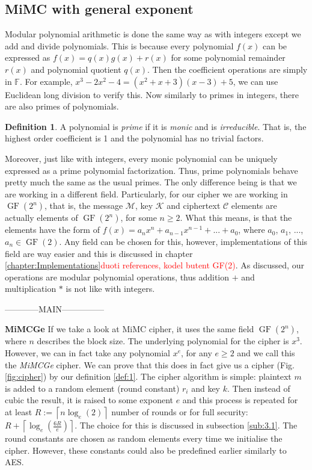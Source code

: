 \documentclass{Resources/UoBLab1}
\theoremstyle{definition}
\newtheorem{definition}[theorem]{Definition}
\begin{document}
\subsection{MiMC with general exponent}
Modular polynomial arithmetic is done the same way as with integers except we add and divide polynomials. This is because every polynomial $f(x)$ can be expressed as $f(x) = q(x)g(x) + r(x)$ for some polynomial remainder $r(x)$ and polynomial quotient $q(x)$. Then the coefficient operations are simply in $\mathbb{F}$. For example, \(x^3-2x^2-4 = (x^2+x+3)(x-3) + 5\), we can use Euclidean long division to verify this. Now similarly to primes in integers, there are also primes of polynomials.
\begin{definition}
    A polynomial is \textit{prime} if it is \textit{monic} and is \textit{irreducible}. That is, the highest order coefficient is 1 and the polynomial has no trivial factors.
\end{definition}
Moreover, just like with integers, every monic polynomial can be uniquely expressed as a prime polynomial factorization. Thus, prime polynomials behave pretty much the same as the usual primes. The only difference being is that we are working in a different field. Particularly, for our cipher we are working in $\operatorname{GF}(2^n)$, that is, the message $\mathcal{M}$, key $\mathcal{K}$ and ciphertext $\mathcal{C}$ elements are actually elements of $\operatorname{GF}(2^n)$, for some $n \ge 2$. What this means, is that the elements have the form of $f(x) = a_nx^n + a_{n-1}x^{n-1} + ... + a_0$, where $a_0$, $a_1$, ..., $a_n \in \operatorname{GF}(2)$. Any field can be chosen for this, however, implementations of this field are way easier and this is discussed in chapter \ref{chapter:Implementations}\textcolor{red}{duoti references, kodel butent GF(2)}. As discussed, our operations are modular polynomial operations, thus addition $+$ and multiplication $*$ is not like with integers.\medskip

------------MAIN---------------

\noindent\textbf{MiMCGe} If we take a look at MiMC cipher\cite{MiMC}, it uses the same field $\operatorname{GF}(2^n)$, where $n$ describes the block size. The underlying polynomial for the cipher is $x^3$. However, we can in fact take any polynomial $x^e$, for any $e \ge 2$ and we call this the \textit{MiMCGe} cipher. We can prove that this does in fact give us a cipher (Fig. \ref{fig:cipher}) by our definition \ref{def:1}. The cipher algorithm is simple: plaintext $m$ is added to a random element (round constant) $r_i$ and key $k$. Then instead of cubic the result, it is raised to some exponent $e$ and this process is repeated for at least $R := \left\lceil n\log_e(2) \right\rceil$ number of rounds or for full security: \(R + \left\lceil \log_e(\frac{6R}{e}) \right\rceil\). The choice for this is discussed in subsection \ref{sub:3.1}. The round constants are chosen as random elements every time we initialise the cipher. However, these constants could also be predefined earlier similarly to AES.
\end{document}
